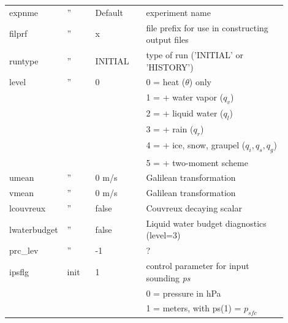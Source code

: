 \documentclass[11pt,a4paper]{article}
\begin{document}
\begin{longtable}[htb]{p{0.12\linewidth}p{0.1\linewidth}p{0.18\linewidth}p{0.5\linewidth}}
expnme       &  ''  & Default             & experiment name                                       \\
filprf       &  ''  & x                   & file prefix for use in constructing output files      \\
runtype      &  ''  & INITIAL             & type of run ('INITIAL' or 'HISTORY')                  \\ 
level        &  ''  & 0                   & \hspace{2mm} 0 = heat ($\theta$) only                 \\ 
             &      &                     & \hspace{2mm} 1 = + water vapor ($q_v$)                \\
             &      &                     & \hspace{2mm} 2 = + liquid water ($q_l$)               \\
             &      &                     & \hspace{2mm} 3 = + rain ($q_r$)                       \\
             &      &                     & \hspace{2mm} 4 = + ice, snow, graupel ($q_i,q_s,q_g$) \\
             &      &                     & \hspace{2mm} 5 = + two-moment scheme                  \\
umean        &  ''  & 0 m/s               & Galilean transformation                               \\ 
vmean        &  ''  & 0 m/s               & Galilean transformation                               \\ 
lcouvreux    &  ''  & false               & Couvreux decaying scalar                              \\
lwaterbudget &  ''  & false               & Liquid water budget diagnostics (level=3)             \\
prc\_lev     &  ''  & -1                  & ?                                                     \\
\hline
ipsflg       & init & 1                   & control parameter for input sounding \textit{ps}      \\
             &      &                     & \hspace{2mm} 0 = pressure in hPa                      \\
             &      &                     & \hspace{2mm} 1 = meters, with ps(1) = $p_{sfc}$       \\

\end{longtable}
\end{document}
